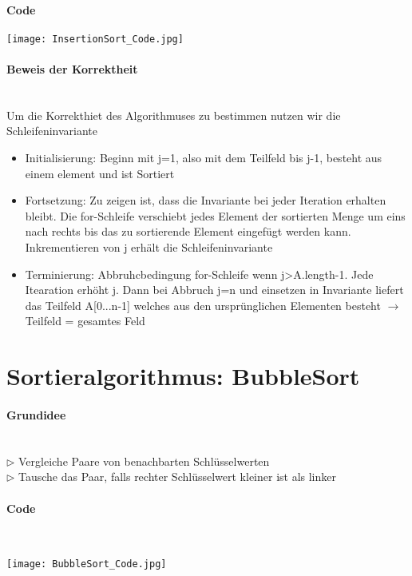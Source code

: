 	\paragraph{Code}
	\begin{center}
		\texttt{[image: InsertionSort\_Code.jpg]}
	\end{center}

	\paragraph{Beweis der Korrektheit} \mbox{} \\
	Um die Korrekthiet des Algorithmuses zu bestimmen nutzen wir die Schleifeninvariante
	\begin{itemize}
		\item Initialisierung: Beginn mit j=1, also mit dem Teilfeld bis j-1, besteht aus einem element und ist Sortiert
		\item Fortsetzung: Zu zeigen ist, dass die Invariante bei jeder Iteration erhalten bleibt.
			Die for-Schleife verschiebt jedes Element der sortierten Menge um eins nach rechts bis das zu
			sortierende Element eingefügt werden kann. Inkrementieren von j erhält die Schleifeninvariante
		\item Terminierung: Abbruhcbedingung for-Schleife wenn j>A.length-1. Jede Itearation erhöht j.
			Dann bei Abbruch j=n und einsetzen in Invariante liefert das Teilfeld A[0...n-1] welches aus den
			ursprünglichen Elementen besteht $\rightarrow$ Teilfeld = gesamtes Feld
	\end{itemize}



\vspace{1.5cm}
\section{Sortieralgorithmus: BubbleSort} %

\paragraph{Grundidee} \mbox{} \\
$\rhd$ Vergleiche Paare von benachbarten Schlüsselwerten \\
$\rhd$ Tausche das Paar, falls rechter Schlüsselwert kleiner ist als linker

\paragraph{Code} \mbox{} \\
\begin{center}
	\texttt{[image: BubbleSort\_Code.jpg]}
\end{center}

